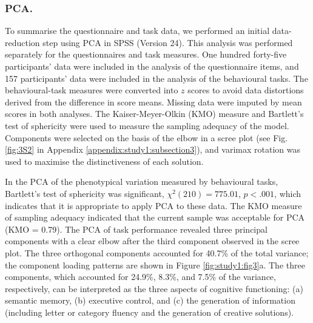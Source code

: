 \subsubsection{PCA.} 
To summarise the questionnaire and task data, we performed an initial data-reduction step using PCA in SPSS (Version 24). This analysis was performed separately for the questionnaires and task measures. One hundred forty-five participants’ data were included in the analysis of the questionnaire items, and 157 participants’ data were included in the analysis of the behavioural tasks. The behavioural-task measures were converted into \(\mathit{z}\) scores to avoid data distortions derived from the difference in score means. Missing data were imputed by mean scores in both analyses. The Kaiser-Meyer-Olkin (KMO) measure and Bartlett’s test of sphericity were used to measure the sampling adequacy of the model. Components were selected on the basis of the elbow in a scree plot (see Fig.\ref{fig:3S2} in Appendix \ref{appendix:study1:subsection3}), and varimax rotation was used to maximise the distinctiveness of each solution.

In the PCA of the phenotypical variation measured by behavioural tasks, Bartlett’s test of sphericity was significant, 
\(\chi^{2}(210) = 775.01\), 
\(\mathit{p} < .001\), 
which indicates that it is appropriate to apply PCA to these data. The KMO measure of sampling adequacy indicated that the current sample was acceptable for PCA (KMO = 0.79). The PCA of task performance revealed three principal components with a clear elbow after the third component observed in the scree plot. The three orthogonal components accounted for 40.7\% of the total variance; the component loading patterns are shown in Figure \ref{fig:study1:fig3}a. The three components, which accounted for 24.9\%, 8.3\%, and 7.5\% of the variance, respectively, can be interpreted as the three aspects of cognitive functioning: (a) semantic memory, (b) executive control, and (c) the generation of information (including letter or category fluency and the generation of creative solutions).

